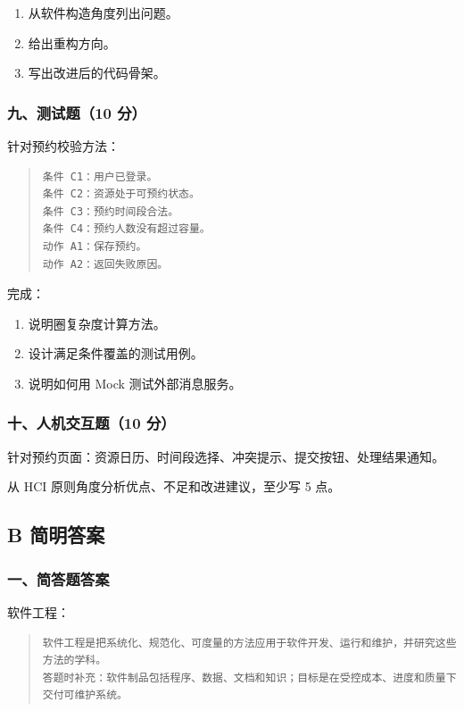 \documentclass[UTF8,zihao=-4]{ctexart}
\begin{document}
\begin{enumerate}
\item 从软件构造角度列出问题。
\item 给出重构方向。
\item 写出改进后的代码骨架。
\end{enumerate}


\subsubsection*{九、测试题（10 分）}


针对预约校验方法：


\begin{quote}
\footnotesize
\begin{verbatim}
条件 C1：用户已登录。
条件 C2：资源处于可预约状态。
条件 C3：预约时间段合法。
条件 C4：预约人数没有超过容量。
动作 A1：保存预约。
动作 A2：返回失败原因。
\end{verbatim}
\end{quote}


完成：


\begin{enumerate}
\item 说明圈复杂度计算方法。
\item 设计满足条件覆盖的测试用例。
\item 说明如何用 Mock 测试外部消息服务。
\end{enumerate}


\subsubsection*{十、人机交互题（10 分）}


针对预约页面：资源日历、时间段选择、冲突提示、提交按钮、处理结果通知。


从 HCI 原则角度分析优点、不足和改进建议，至少写 5 点。


\subsection{B 简明答案}


\subsubsection*{一、简答题答案}


软件工程：


\begin{quote}
\footnotesize
\begin{verbatim}
软件工程是把系统化、规范化、可度量的方法应用于软件开发、运行和维护，并研究这些方法的学科。
答题时补充：软件制品包括程序、数据、文档和知识；目标是在受控成本、进度和质量下交付可维护系统。
\end{verbatim}
\end{quote}
\end{document}
